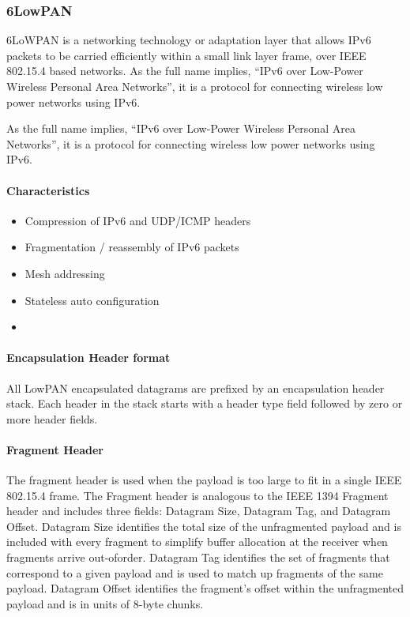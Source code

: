 \subsubsection{6LowPAN}

6LoWPAN is a networking technology or adaptation layer that allows IPv6 packets to be carried efficiently within a small link layer frame,
	over IEEE 802.15.4 based networks.
As the full name implies,
	“IPv6 over Low-Power Wireless Personal Area Networks”,
	it is a protocol for connecting wireless low power networks using IPv6.

As the full name implies,
	“IPv6 over Low-Power Wireless Personal Area Networks”,
	it is a protocol for connecting wireless low power networks using IPv6.

\paragraph{Characteristics}
	\begin{itemize}
		\item Compression of IPv6 and UDP/ICMP headers
		\item Fragmentation / reassembly of IPv6 packets
		\item Mesh addressing
		\item Stateless auto configuration
		\item 
	\end{itemize}
	
\paragraph{Encapsulation Header format}
All LowPAN encapsulated datagrams are prefixed by an encapsulation header stack.
Each header in the stack starts with a header type field followed by zero or more header fields.

\paragraph{Fragment Header}
The fragment header is used when the payload is too large to fit in a single IEEE 802.15.4 frame.
The Fragment header is analogous to the IEEE 1394 Fragment header and includes three fields:
	Datagram Size,
	Datagram Tag,
	and Datagram Offset.
Datagram Size identifies the total size of the unfragmented payload and is included with every fragment to simplify buffer allocation at the receiver when fragments arrive out-oforder.
Datagram Tag identifies the set of fragments that correspond to a given payload and is used to match up fragments of the same payload.
Datagram Offset identifies the fragment’s offset within the unfragmented payload and is in units of 8-byte chunks.

